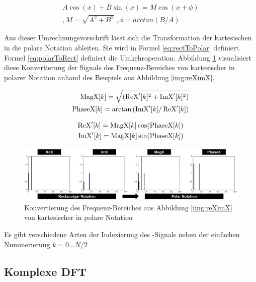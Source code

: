 \begin{equation}
\begin{split}
A \cos(x) + B \sin(x) = M \cos(x + \phi) \\
,M = \sqrt{A^2 + B^2} \;, \phi = arctan(B/A)
\end{split}
\label{eq:sinToCosinus}
\end{equation}


Aus dieser Umrechnungsvorschrift lässt sich die Transformation der kartesischen in die polare Notation ableiten. Sie wird in Formel \ref{eq:rectToPolar} definiert. Formel \ref{eq:polarToRect} definiert die Umkehroperation. Abbildung \ref{img:rectToPolar} visualisiert diese Konvertierung der Signale des Frequenz-Bereiches von kartesischer in polarer Notation anhand des Beispiels aus Abbildung \ref{img:reXimX}.

\begin{equation}
\begin{split}
\text{MagX}[k] = \sqrt{(\operatorname{ReX}'[k]^2 + \operatorname{ImX}'[k]^2 ) }\\
\text{PhaseX}[k] = \arctan{(\operatorname{ImX}'[k] / \operatorname{ReX}'[k]) }
\end{split}
\label{eq:rectToPolar}
\end{equation}

\begin{equation}
\begin{split}
\operatorname{ReX}'[k] = \text{MagX}[k] \cos(\text{PhaseX}[k])\\
\operatorname{ImX}'[k] = \text{MagX}[k] \sin(\text{PhaseX}[k])
\end{split}
\label{eq:polarToRect}
\end{equation}

\begin{figure}[h]
	\centering
	\includegraphics[width=1\textwidth]{bilder/rectToPolar.png}
	\caption{ Konvertierung des Frequenz-Bereiches aus Abbildung \ref{img:reXimX}  von kartesischer in polare Notation}
	\label{img:rectToPolar}
\end{figure}

Es gibt verschiedene Arten der Indexierung des -Signals neben der einfachen Nummerierung $k = 0 \ldots N/2$

\subsection{Komplexe DFT}
\label{sec:comDFT}

